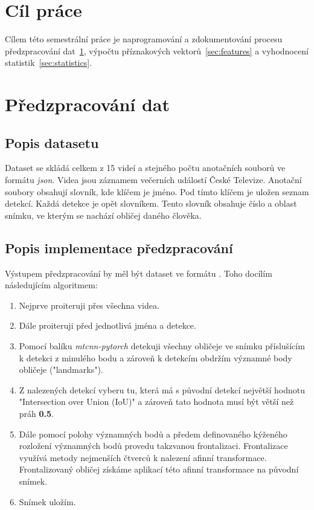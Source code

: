 \documentclass[11pt]{article}
\begin{document}
    \section*{Cíl práce}
    Cílem této semestrální práce je naprogramování a zdokumentování procesu předzpracování dat~\ref{sec:preprocessing},
    výpočtu příznakových vektorů~\ref{sec:features} a vyhodnocení statistik~\ref{sec:statistics}.


    \section{Předzpracování dat}\label{sec:preprocessing}

    \subsection{Popis datasetu}\label{subsec:dataset}
    Dataset se skládá celkem z 15 videí a stejného počtu anotačních souborů ve formátu \textit{json}.
    Videa jsou záznamem večerních událostí České Televize.
    Anotační soubory obsahují slovník, kde klíčem je jméno.
    Pod tímto klíčem je uložen seznam detekcí.
    Každá detekce je opět slovníkem.
    Tento slovník obsahuje číslo a oblast snímku, ve kterým se nachází obličej daného člověka.

    \subsection{Popis implementace předzpracování}
    Výstupem předzpracování by měl být dataset ve formátu .
    Toho docílím následujícím algoritmem:

    \begin{enumerate}
        \item Nejprve proiteruji přes všechna videa.
        \item Dále proiteruji před jednotlivá jména a detekce.
        \item Pomocí balíku \textit{mtcnn-pytorch} detekuji všechny obličeje ve snímku příslušícím k detekci z minulého
        bodu a zároveň k detekcím obdržím významné body obličeje ("landmarks").
        \item Z nalezených detekcí vyberu tu, která má s původní detekcí největší hodnotu
        "Intersection over Union (IoU)" a zároveň tato hodnota musí být větší než práh \textbf{0.5}.
        \item Dále pomocí polohy významných bodů a předem definovaného kýženého rozložení významných bodů provedu
        takzvanou frontalizaci.
        Frontalizace využívá metody nejmenších čtverců k nalezení afinní transformace.
        Frontalizovaný obličej získáme aplikací této afinní transformace na původní snímek.
        \item Snímek uložím.
    \end{enumerate}
\end{document}
